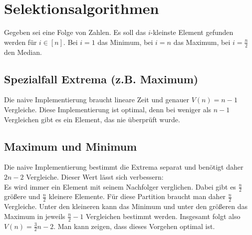 \documentclass[a4paper, 12pt]{article}
\begin{document}
	\section{Selektionsalgorithmen}
	Gegeben sei eine Folge von Zahlen. Es soll das $i$-kleinste Element gefunden werden für $i \in [n]$. Bei $i=1$ das Minimum, bei $i=n$ das Maximum, bei $i = \frac{n}{2}$ den Median.\\
	\subsection{Spezialfall Extrema (z.B. Maximum)} 
	Die naive Implementierung braucht lineare Zeit und genauer $V(n) = n-1$ Vergleiche. Diese Implementierung ist optimal, denn bei weniger als $n-1$ Vergleichen gibt es ein Element, das nie überprüft wurde.
	\subsection{Maximum und Minimum}
	Die naive Implementierung bestimmt die Extrema separat und benötigt daher $2n-2$ Vergleiche. Dieser Wert lässt sich verbessern:\\ Es wird immer ein Element mit seinem Nachfolger verglichen. Dabei gibt es $\frac{n}{2}$ größere und $\frac{n}{2}$ kleinere Elemente. Für diese Partition braucht man daher $\frac{n}{2}$ Vergleiche. Unter den kleineren kann das Minimum und unter den größeren das Maximum in jeweils $\frac{n}{2}-1$ Vergleichen bestimmt werden. Insgesamt folgt also $V(n) = \frac{3}{2}n-2$. Man kann zeigen, dass dieses Vorgehen optimal ist.
\end{document}
